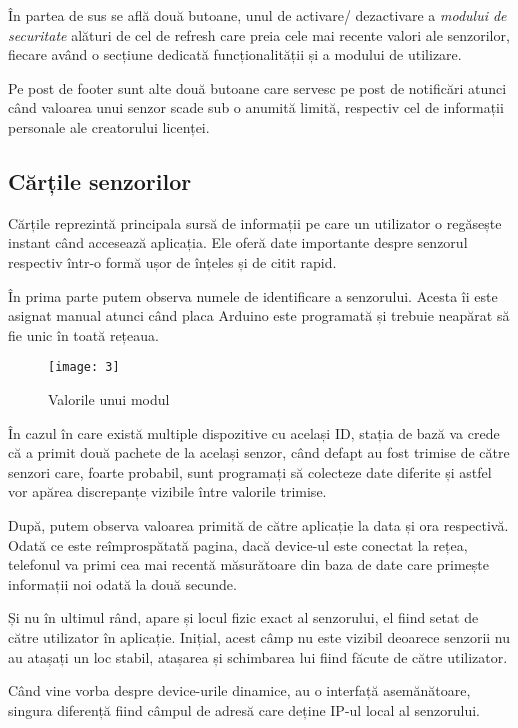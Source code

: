 În partea de sus se află două butoane, unul de activare/ dezactivare a \emph{modului de securitate} alături de cel de refresh care preia cele mai recente valori ale senzorilor, fiecare având o secțiune dedicată funcționalității și a modului de utilizare.

Pe post de footer sunt alte două butoane care servesc pe post de notificări atunci când valoarea unui senzor scade sub o anumită limită, respectiv cel de informații personale ale creatorului licenței.

\subsection{Cărțile senzorilor}

Cărțile reprezintă principala sursă de informații pe care un utilizator o regăsește instant când accesează aplicația. Ele oferă date importante despre senzorul respectiv într-o formă ușor de înțeles și de citit rapid.

În prima parte putem observa numele de identificare a senzorului. Acesta îi este asignat manual atunci când placa Arduino este programată și trebuie neapărat să fie unic în toată rețeaua. 

\begin{wrapfigure}{r}{0.4\textwidth}
	\texttt{[image: 3]}
	\caption{Valorile unui modul}
	\label{fig:3}
\end{wrapfigure}

În cazul în care există multiple dispozitive cu același ID, stația de bază va crede că a primit două pachete de la același senzor, când defapt au fost trimise de către senzori care, foarte probabil, sunt programați să colecteze date diferite și astfel vor apărea discrepanțe vizibile între valorile trimise.

După, putem observa valoarea primită de către aplicație la data și ora respectivă. Odată ce este reîmprospătată pagina, dacă device-ul este conectat la rețea, telefonul va primi cea mai recentă măsurătoare din baza de date care primește informații noi odată la două secunde.

Și nu în ultimul rând, apare și locul fizic exact al senzorului, el fiind setat de către utilizator în aplicație. Inițial, acest câmp nu este vizibil deoarece senzorii nu au atașați un loc stabil, atașarea și schimbarea lui fiind făcute de către utilizator.

Când vine vorba despre device-urile dinamice, au o interfață asemănătoare, singura diferență fiind câmpul de adresă care deține IP-ul local al senzorului.


